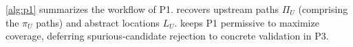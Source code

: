 







\autoref{alg:p1} summarizes the workflow of P1.
\sys recovers upstream paths
$\Pi_U$ (comprising the $\pi_U$ paths) and abstract locations $L_U$. \sys keeps P1 permissive to maximize coverage, deferring spurious-candidate rejection to concrete validation in P3.

